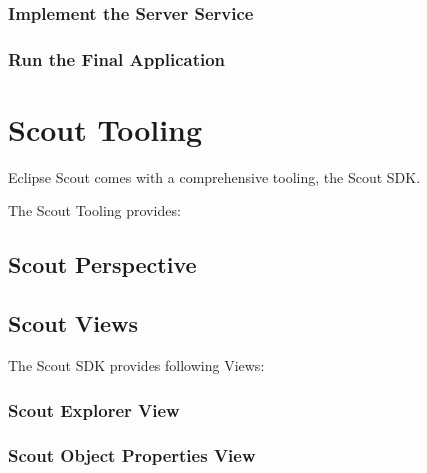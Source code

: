\documentclass[a4paper,10pt,twoside]{book}
\begin{document}
\subsection{Implement the Server Service}

\subsection{Run the Final Application}


\chapter*{Scout Tooling}

Eclipse Scout comes with a comprehensive tooling, the Scout SDK.


The Scout Tooling provides:

\section{Scout Perspective}


\section{Scout Views}

The Scout SDK provides following Views:

\subsection{Scout Explorer View}

\subsection{Scout Object Properties View}\label{subsec:xxxxxxxxxxxx}

\end{document}
